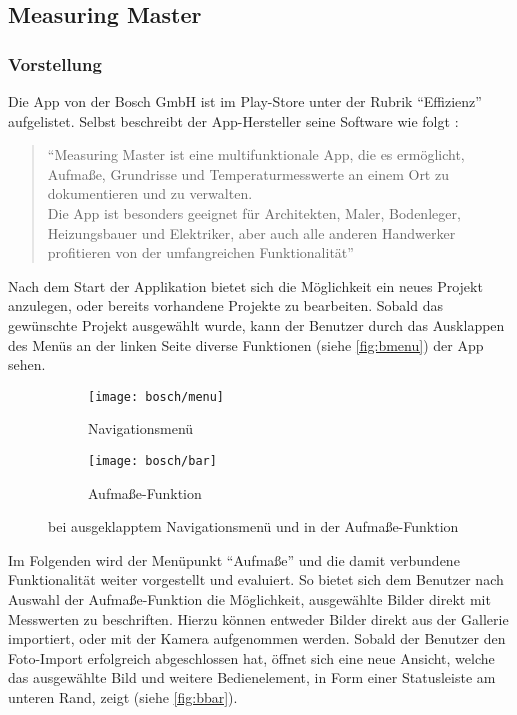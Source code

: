 \subsection{Measuring Master}

\subsubsection{Vorstellung}
Die App \mm{} von der Bosch GmbH ist im Play-Store unter der Rubrik ``Effizienz'' aufgelistet.
Selbst beschreibt der App-Hersteller seine Software wie folgt \citep{BoschMM}:

\begin{quote}
  ``Measuring Master ist eine multifunktionale App, die es ermöglicht, Aufmaße, Grundrisse und Temperaturmesswerte an einem Ort zu dokumentieren und zu verwalten.\\
  Die App ist besonders geeignet für Architekten, Maler, Bodenleger, Heizungsbauer und Elektriker, aber auch alle anderen Handwerker profitieren von der umfangreichen Funktionalität''
\end{quote}

\noindent
Nach dem Start der Applikation bietet sich die Möglichkeit ein neues Projekt anzulegen, oder bereits vorhandene Projekte zu bearbeiten.
Sobald das gewünschte Projekt ausgewählt wurde, kann der Benutzer durch das Ausklappen des Menüs an der linken Seite diverse Funktionen (siehe \autoref{fig:bmenu}) der App sehen. \\

\begin{figure}[h]
  \centering
  \begin{subfigure}[t]{0.4\textwidth}
    \texttt{[image: bosch/menu]}
    \caption{Navigationsmenü}\label{fig:bmenu}	
  \end{subfigure}
  \begin{subfigure}[t]{0.4\textwidth}
    \texttt{[image: bosch/bar]}
    \caption{Aufmaße-Funktion}\label{fig:bbar}
  \end{subfigure}
  \caption{\mm{} bei ausgeklapptem Navigationsmenü und in der Aufmaße-Funktion}
\end{figure}

Im Folgenden wird der Menüpunkt ``Aufmaße'' und die damit verbundene Funktionalität weiter vorgestellt und evaluiert.
So bietet sich dem Benutzer nach Auswahl der Aufmaße-Funktion die Möglichkeit, ausgewählte Bilder direkt mit Messwerten zu beschriften.
Hierzu können entweder Bilder direkt aus der Gallerie importiert, oder mit der Kamera aufgenommen werden.
Sobald der Benutzer den Foto-Import erfolgreich abgeschlossen hat, öffnet sich eine neue Ansicht, welche das ausgewählte Bild und weitere Bedienelement, in Form einer Statusleiste am unteren Rand, zeigt (siehe \autoref{fig:bbar}). \\

